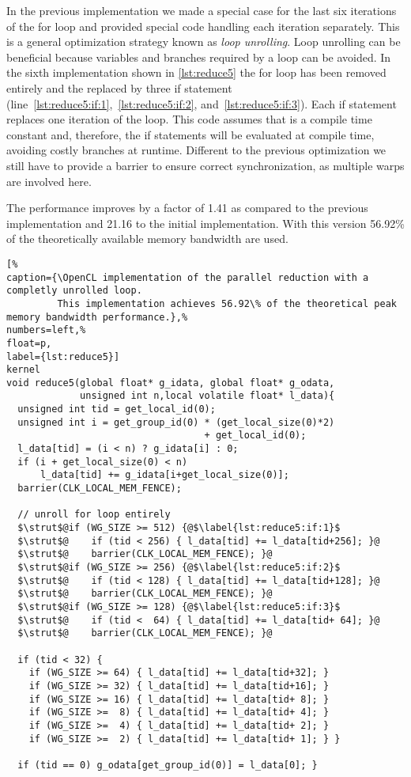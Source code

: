In the previous implementation we made a special case for the last six iterations of the for loop and provided special code handling each iteration separately.
This is a general optimization strategy known as \emph{loop unrolling}.
Loop unrolling can be beneficial because variables and branches required by a loop can be avoided.
In the sixth implementation shown in \autoref{lst:reduce5} the for loop has been removed entirely and the replaced by three if statement (line~\ref{lst:reduce5:if:1},~\ref{lst:reduce5:if:2}, and~\ref{lst:reduce5:if:3}).
Each if statement replaces one iteration of the loop.
This code assumes that  is a compile time constant and, therefore, the if statements will be evaluated at compile time, avoiding costly branches at runtime.
Different to the previous optimization we still have to provide a barrier to ensure correct synchronization, as multiple warps are involved here.

The performance improves by a factor of 1.41 as compared to the previous implementation and 21.16 to the initial implementation.
With this version 56.92\% of the theoretically available memory bandwidth are used.

\begin{lstlisting}[%                                                             
caption={\OpenCL implementation of the parallel reduction with a completly unrolled loop.
         This implementation achieves 56.92\% of the theoretical peak memory bandwidth performance.},%
numbers=left,%
float=p,
label={lst:reduce5}]
kernel
void reduce5(global float* g_idata, global float* g_odata,
             unsigned int n,local volatile float* l_data){
  unsigned int tid = get_local_id(0);
  unsigned int i = get_group_id(0) * (get_local_size(0)*2)
                                   + get_local_id(0);
  l_data[tid] = (i < n) ? g_idata[i] : 0;
  if (i + get_local_size(0) < n) 
      l_data[tid] += g_idata[i+get_local_size(0)];  
  barrier(CLK_LOCAL_MEM_FENCE);

  // unroll for loop entirely
  $\strut$@if (WG_SIZE >= 512) {@$\label{lst:reduce5:if:1}$
  $\strut$@    if (tid < 256) { l_data[tid] += l_data[tid+256]; }@
  $\strut$@    barrier(CLK_LOCAL_MEM_FENCE); }@
  $\strut$@if (WG_SIZE >= 256) {@$\label{lst:reduce5:if:2}$
  $\strut$@    if (tid < 128) { l_data[tid] += l_data[tid+128]; }@
  $\strut$@    barrier(CLK_LOCAL_MEM_FENCE); }@
  $\strut$@if (WG_SIZE >= 128) {@$\label{lst:reduce5:if:3}$
  $\strut$@    if (tid <  64) { l_data[tid] += l_data[tid+ 64]; }@
  $\strut$@    barrier(CLK_LOCAL_MEM_FENCE); }@
  
  if (tid < 32) {
    if (WG_SIZE >= 64) { l_data[tid] += l_data[tid+32]; }
    if (WG_SIZE >= 32) { l_data[tid] += l_data[tid+16]; }
    if (WG_SIZE >= 16) { l_data[tid] += l_data[tid+ 8]; }
    if (WG_SIZE >=  8) { l_data[tid] += l_data[tid+ 4]; }
    if (WG_SIZE >=  4) { l_data[tid] += l_data[tid+ 2]; }
    if (WG_SIZE >=  2) { l_data[tid] += l_data[tid+ 1]; } }
  
  if (tid == 0) g_odata[get_group_id(0)] = l_data[0]; }
\end{lstlisting}


